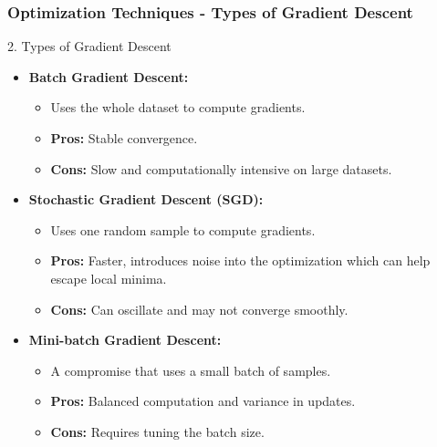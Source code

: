 \documentclass[aspectratio=169]{beamer}
\begin{document}
\begin{frame}[fragile]
    \frametitle{Optimization Techniques - Types of Gradient Descent}
    \begin{block}{2. Types of Gradient Descent}
        \begin{itemize}
            \item \textbf{Batch Gradient Descent:}
                \begin{itemize}
                    \item Uses the whole dataset to compute gradients.
                    \item \textbf{Pros:} Stable convergence.
                    \item \textbf{Cons:} Slow and computationally intensive on large datasets.
                \end{itemize}
            \item \textbf{Stochastic Gradient Descent (SGD):}
                \begin{itemize}
                    \item Uses one random sample to compute gradients.
                    \item \textbf{Pros:} Faster, introduces noise into the optimization which can help escape local minima.
                    \item \textbf{Cons:} Can oscillate and may not converge smoothly.
                \end{itemize}
            \item \textbf{Mini-batch Gradient Descent:}
                \begin{itemize}
                    \item A compromise that uses a small batch of samples.
                    \item \textbf{Pros:} Balanced computation and variance in updates.
                    \item \textbf{Cons:} Requires tuning the batch size.
                \end{itemize}
        \end{itemize}
    \end{block}
\end{frame}
\end{document}
